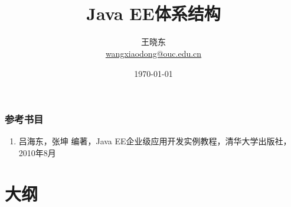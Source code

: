 
\title[KevinW@OUC]{\\  
 Java EE体系结构}
\author[王晓东]{王晓东\\
  \href{mailto:wangxiaodong@ouc.edu.cn}{\footnotesize wangxiaodong@ouc.edu.cn}}
\date{\today}


 \frame{\titlepage}
\begin{frame}
\frametitle{参考书目}
\begin{enumerate}
\item 吕海东，张坤 编著，Java EE企业级应用开发实例教程，清华大学出版社，2010年8月
\end{enumerate}  
\end{frame}


\section*{大纲}

